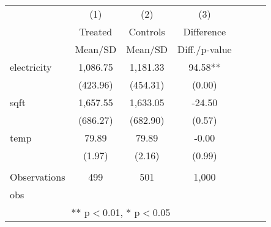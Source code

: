 {\def\sym#1{\ifmmode^{#1}\else\(^{#1}\)\fi} \begin{tabular}{l*{3}{cc}} \hline
                    &\multicolumn{1}{c}{(1)}&\multicolumn{1}{c}{(2)}&\multicolumn{1}{c}{(3)}\\
                    &\multicolumn{1}{c}{Treated}&\multicolumn{1}{c}{Controls}&\multicolumn{1}{c}{Difference}\\
                    &     Mean/SD&     Mean/SD&Diff./p-value  \\
\hline
electricity         &    1,086.75&    1,181.33&       94.58**\\
                    &    (423.96)&    (454.31)&      (0.00)  \\
sqft                &    1,657.55&    1,633.05&      -24.50  \\
                    &    (686.27)&    (682.90)&      (0.57)  \\
temp                &       79.89&       79.89&       -0.00  \\
                    &      (1.97)&      (2.16)&      (0.99)  \\
 & & & \\
Observations        &         499&         501&       1,000  \\
obs                 &            &            &              \\
\hline \multicolumn{4}{c}{ ** p$<$0.01, * p$<$0.05} \\ \end{tabular} }

